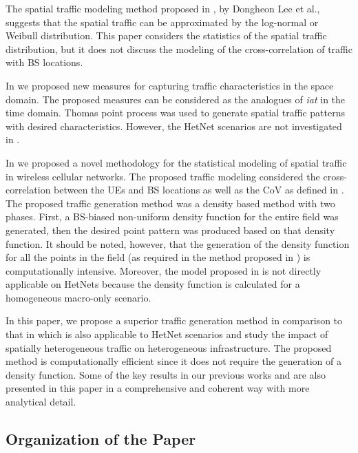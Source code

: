 \documentclass[journal]{IEEEtran}
\begin{document}
The spatial traffic modeling method proposed in \cite{dongheon2014}, by Dongheon Lee et al., suggests that the spatial traffic can be approximated by the log-normal or Weibull distribution. This paper considers the statistics of the spatial traffic distribution, but it does not discuss the modeling of the cross-correlation of traffic with BS locations.

In \cite{Mira1406:Unified} we proposed new measures for capturing traffic characteristics in the space domain. The proposed measures can be considered as the analogues of \textit{iat} in the time domain. Thomas point process was used to generate spatial traffic patterns with desired characteristics. However, the HetNet scenarios are not investigated in \cite{Mira1406:Unified}.

In \cite{mirahsan_gc14} we proposed a novel methodology for the statistical modeling of spatial traffic in wireless cellular networks. The proposed traffic modeling considered the cross-correlation between the UEs and BS locations as well as the CoV as defined in \cite{Mira1406:Unified}. The proposed traffic generation method was a density based method with two phases. First, a BS-biased non-uniform density function for the entire field was generated, then the desired point pattern was produced based on that density function. It should be noted, however, that the generation of the density function for all the points in the field (as required in the method proposed in \cite{mirahsan_gc14}) is computationally intensive. Moreover, the model proposed in \cite{mirahsan_gc14} is not directly applicable on HetNets because the density function is calculated for a homogeneous macro-only scenario.

In this paper, we propose a superior traffic generation method in comparison to that in \cite{mirahsan_gc14} which is also applicable to HetNet scenarios and study the impact of spatially heterogeneous traffic on heterogeneous infrastructure. The proposed method is computationally efficient since it does not require the generation of a density function. Some of the key results in our previous works \cite{Mira1406:Unified} and \cite{mirahsan_gc14} are also presented in this paper in a comprehensive and coherent way with more analytical detail.








\subsection{Organization of the Paper}
\end{document}
